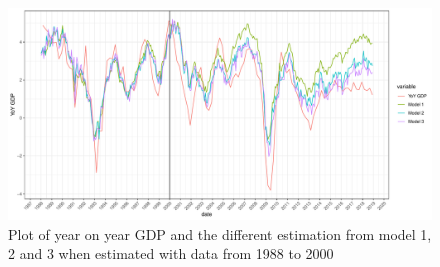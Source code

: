 \documentclass[12pt,a4paper,oneside]{book}
\begin{document}
\begin{figure}[H]
    \centering
    \includegraphics[scale=0.5]{Graphs/predictions2.pdf}
    \caption{Plot of year on year GDP and the different estimation from model 1, 2 and 3 when estimated with data from 1988 to 2000}
    \label{fig:predictions2}
\end{figure}
\end{document}
